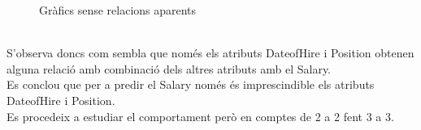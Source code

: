 \documentclass[a4paper, 11pt]{article}
\begin{document}
\begin{figure}[h]
 \centering
   \caption{Gràfics sense relacions aparents}
\end{figure}\\
S'observa doncs com sembla que només els atributs DateofHire i Position obtenen alguna relació amb combinació dels altres atributs amb el Salary. \\
Es conclou que per a predir el Salary només és imprescindible  els atributs DateofHire i Position.\\
Es procedeix a estudiar el comportament però en comptes de 2 a 2 fent 3 a 3.
\newpage
\end{document}
